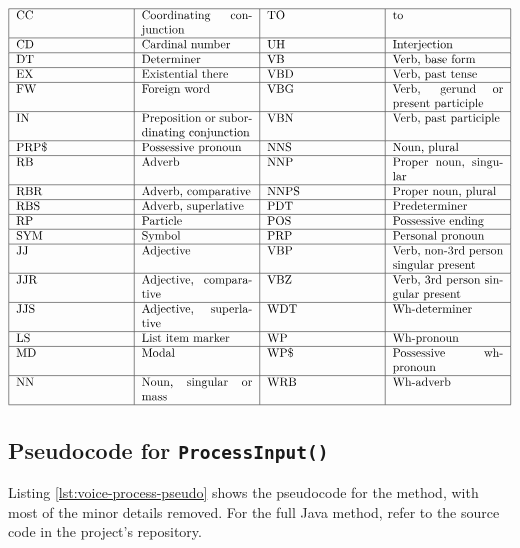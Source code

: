 \documentclass[11pt]{article}
\begin{document}
\begin{appendices}
$$
\begin{tabular}{ |p{3.25cm}|p{3.25cm}|p{3.25cm}|p{3.25cm}| }
\hline
	CC & Coordinating\ conjunction & TO & to \\ \hline
	CD & Cardinal\ number & UH & Interjection \\ \hline
	DT & Determiner & VB & Verb, base\ form \\ \hline
	EX & Existential\ there & VBD & Verb, past\ tense \\ \hline
	FW & Foreign\ word & VBG & Verb, gerund\ or\ present\ participle \\ \hline
	IN & Preposition\ or\ subordinating conjunction & VBN & Verb, past\ participle \\ \hline
	PRP\$ & Possessive\ pronoun & NNS & Noun,\ plural \\ \hline
	RB & Adverb & NNP & Proper\ noun,\ singular \\ \hline
	RBR & Adverb,\ comparative & NNPS & Proper\ noun, plural \\ \hline
	RBS & Adverb,\ superlative & PDT & Predeterminer \\ \hline
	RP & Particle & POS & Possessive\ ending \\ \hline
	SYM & Symbol & PRP & Personal\ pronoun \\ \hline
	JJ & Adjective & VBP & Verb, non-3rd\ person\ singular\ present \\ \hline
	JJR & Adjective, comparative & VBZ & Verb, 3rd\ person\ singular\ present \\ \hline
	JJS & Adjective,\ superlative & WDT & Wh-determiner \\ \hline
	LS & List\ item\ marker & WP & Wh-pronoun \\ \hline
	MD & Modal & WP\$ & Possessive\ wh-pronoun \\ \hline
	NN & Noun,\ singular\ or\ mass & WRB & Wh-adverb \\ \hline
\end{tabular}
$$

\newpage

\subsection{Pseudocode for \texttt{ProcessInput()}}
\label{appendix:process-input-pseudo}

Listing \ref{lst:voice-process-pseudo} shows the pseudocode for the method, with most of the minor details removed. For the full Java method, refer to the source code in the project's repository.



\end{appendices}
\end{document}
